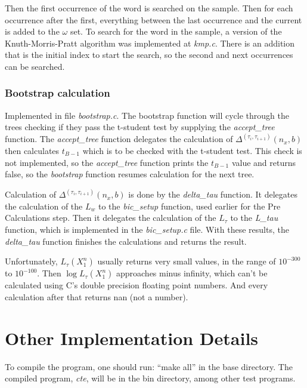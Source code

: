 \documentclass[brazil,11pt]{article}
\begin{document}
Then the first occurrence of the word is searched on the sample. Then for each occurrence after the first, everything between the last occurrence and the current is added to the $\omega$ set. To search for the word in the sample, a version of the Knuth-Morris-Pratt algorithm was implemented at \emph{kmp.c}. There is an addition that is the initial index to start the search, so the second and next occurrences can be searched.


\subsubsection{Bootstrap calculation}

Implemented in file \emph{bootstrap.c}. The bootstrap function will cycle through the trees checking if they pass the t-student test by supplying the \emph{accept\_tree} function. The \emph{accept\_tree} function delegates the calculation of $\Delta^{(\tau_i,\tau_{i+1})}(n_x,b)$ then calculates $t_{B-1}$ which is to be checked with the t-student test. This check is not implemented, so the \emph{accept\_tree} function prints the $t_{B-1}$ value and returns false, so the \emph{bootstrap} function resumes calculation for the next tree.

Calculation of $\Delta^{(\tau_i,\tau_{i+1})}(n_x,b)$ is done by the \emph{delta\_tau} function. It delegates the calculation of the $L_w$ to the \emph{bic\_setup} function, used earlier for the Pre Calculations step. Then it delegates the calculation of the $L_\tau$ to the \emph{L\_tau} function, which is implemented in the \emph{bic\_setup.c} file. With these results, the \emph{delta\_tau} function finishes the calculations and returns the result.

Unfortunately, $L_\tau(X^n_1)$ usually returns very small values, in the range of $10^{-300}$ to $10^{-100}$. Then $\log L_\tau(X^n_1)$ approaches minus infinity, which can't be calculated using C's double precision floating point numbers. And every calculation after that returns nan (not a number).


\section{Other Implementation Details}

To compile the program, one should run: ``make all'' in the base directory. The compiled program, \emph{cte}, will be in the bin directory, among other test programs.
\end{document}
